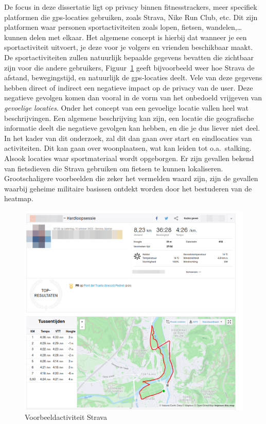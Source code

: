 De focus in deze dissertatie ligt op privacy binnen fitnesstrackers, meer
specifiek platformen die \ac{gps}-locaties gebruiken, zoals Strava, Nike Run Club,
etc. Dit zijn platformen waar personen sportactiviteiten zoals lopen, fietsen,
wandelen,\ldots kunnen delen met elkaar. Het algemene concept is hierbij dat
wanneer je een sportactiviteit uitvoert, je deze voor je volgers en vrienden
beschikbaar maakt. De sportactiviteiten zullen natuurlijk bepaalde gegevens
bevatten die zichtbaar zijn voor die andere gebruikers,
Figuur~\ref{fig:activityExample} geeft bijvoorbeeld weer hoe Strava de afstand,
bewegingstijd, en natuurlijk de \ac{gps}-locaties deelt. Vele van deze gegevens
hebben direct of indirect een negatieve impact op de privacy van de user. Deze
negatieve gevolgen komen dan vooral in de vorm van het onbedoeld vrijgeven van
\textit{gevoelige locaties}. Onder het concept van een gevoelige locatie vallen
heel wat beschrijvingen. Een algemene beschrijving kan zijn, een locatie die
geografische informatie deelt die negatieve gevolgen kan hebben, en die je dus
liever niet deel. In het kader van dit onderzoek, zal dit dan gaan over start
en eindlocaties van activiteiten. Dit kan gaan over woonplaatsen, wat kan
leiden tot o.a.\ stalking. Alsook locaties waar sportmateriaal wordt
opgeborgen. Er zijn gevallen bekend van fietsdieven die Strava gebruiken om
fietsen te kunnen lokaliseren\cite{Sportapp72:online}\cite{Cyclistw89:online}.
Grootschaligere voorbeelden die zeker het vermelden waard zijn, zijn de
gevallen waarbij geheime militaire basissen ontdekt worden door het bestuderen
van de heatmap\cite{Fitnesst33:online}.
\begin{figure}
    \centering
    \includegraphics[width=0.5\linewidth]{fig/VoorbeeldActiviteiten/VoorbeeldActiviteit_Cropped.png}
    \caption{Voorbeeldactiviteit Strava}\label{fig:activityExample}
\end{figure}

